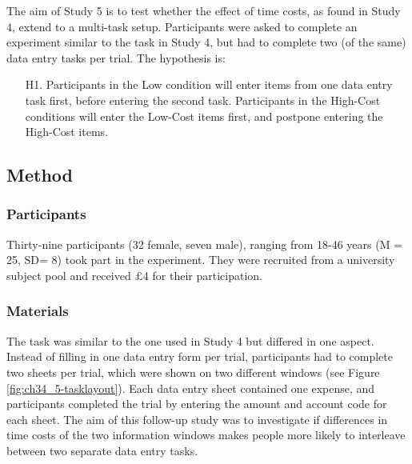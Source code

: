 The aim of Study 5 is to test whether the effect of time costs, as found in Study 4, extend to a multi-task setup. Participants were asked to complete an experiment similar to the task in Study 4, but had to complete two (of the same) data entry tasks per trial. The hypothesis is:

\begin{itemize}
\item [H1.]
Participants in the Low condition will enter items from one data entry task first, before entering the second task. Participants in the High-Cost conditions will enter the Low-Cost items first, and postpone entering the High-Cost items.
\end{itemize}

\subsection{Method}
\subsubsection{Participants}
Thirty-nine participants (32 female, seven male), ranging from 18-46 years (M = 25, SD= 8) took part in the experiment. They were recruited from a university subject pool and received $\pounds$4 for their participation.

\subsubsection{Materials}
The task was similar to the one used in Study 4 but differed in one aspect. Instead of filling in one data entry form per trial, participants had to complete two sheets per trial, which were shown on two different windows (see Figure \ref{fig:ch34_5-tasklayout}). Each data entry sheet contained one expense, and participants completed the trial by entering the amount and account code for each sheet. The aim of this follow-up study was to investigate if differences in time costs of the two information windows makes people more likely to interleave between two separate data entry tasks.

